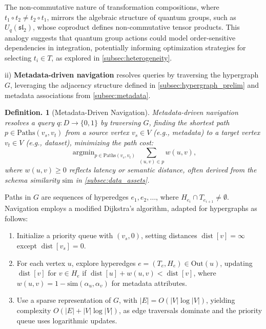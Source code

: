 \documentclass{amsart}
\newtheorem{defn}[thm]{Definition.}
\DeclareMathOperator\argmin{argmin}
\DeclareMathOperator\dist{dist}
\begin{document}
The non-commutative nature of transformation compositions, where \( t_1 \circ t_2 \neq t_2 \circ t_1 \), mirrors the algebraic structure of quantum groups, such as \( U_q(\mathfrak{sl}_2) \), whose coproduct defines non-commutative tensor products. This analogy suggests that quantum group actions could model order-sensitive dependencies in integration, potentially informing optimization strategies for selecting \( t_i \in T \), as explored in \cref{subsec:heterogeneity}.


ii) \textbf{Metadata-driven navigation} resolves queries by traversing the hypergraph \( G \), leveraging the adjacency structure defined in \cref{subsec:hypergraph_prelim} and metadata associations from \cref{subsec:metadata}.

\begin{defn}[Metadata-Driven Navigation]
\label{navigation}
\emph{Metadata-driven navigation} resolves a query \( q: D \to \{0, 1\} \) by traversing \( G \), finding the shortest path \( p \in \text{Paths}(v_s, v_t) \) from a source vertex \( v_s \in V \) (e.g., metadata) to a target vertex \( v_t \in V \) (e.g., dataset), minimizing the path cost:
\[
\argmin_{p \in \text{Paths}(v_s, v_t)} \sum_{(u,v) \in p} w(u,v),
\]
where \( w(u,v) \geq 0 \) reflects latency or semantic distance, often derived from the schema similarity \( \text{sim} \) in \cref{subsec:data_assets}.
\end{defn}

Paths in \( G \) are sequences of hyperedges \( e_1, e_2, \ldots \), where \( H_{e_i} \cap T_{e_{i+1}} \neq \emptyset \). Navigation employs a modified Dijkstra’s algorithm, adapted for hypergraphs as follows:
%
\begin{enumerate}
    \item Initialize a priority queue with \( (v_s, 0) \), setting distances \( \dist [v] = \infty \) except \( \dist[v_s] = 0 \).
    
    \item For each vertex \( u \), explore hyperedges \( e = (T_e, H_e) \in \text{Out}(u) \), updating \( \dist[v] \) for \( v \in H_e \) if \( \dist[u] + w(u, v) < \dist[v] \), where \( w(u,v) = 1 - \text{sim}(\alpha_u, \alpha_v) \) for metadata attributes.
    
    \item Use a sparse representation of \( G \), with \( |E| = O(|V| \log |V|) \), yielding complexity \( O(|E| + |V| \log |V|) \), as edge traversals dominate and the priority queue uses logarithmic updates.
\end{enumerate}
\end{document}

